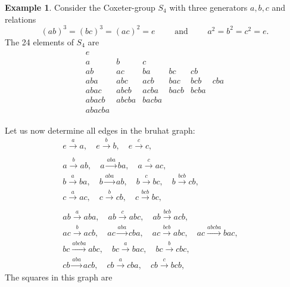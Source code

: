 \documentclass{amsart}
\theoremstyle{definition}
\newtheorem{example}{Example}
\begin{document}
\begin{example}
	Consider the Coxeter-group $S_4$ with three generators $a,b,c$ and relations
	$$
		(ab)^3=(bc)^3=(ac)^2 = e \quad\quad \text{ and } \quad\quad a^2 = b^2 = c^2 = e. 
	$$
	The 24 elements of $S_4$ are
	\begin{gather*}
		\begin{matrix}
			e 		&			&			&			&			& 		\\
			a 		& b 		& c 		&			&			&		\\
			ab 		& ac 		& ba		& bc		& cb 		&		\\
			aba		& abc		& acb		& bac		& bcb		& cba	\\
			abac	& abcb	 	& acba 		& bacb 		& bcba		&		\\
			abacb	& abcba		& bacba		&			&			&		\\
			abacba
		\end{matrix}
	\end{gather*}
	
	Let us now determine all edges in the bruhat graph:
	\begin{gather*}
		e \overset{a}\rightarrow a, \quad
		e \overset{b}\rightarrow b, \quad
		e \overset{c}\rightarrow c, \quad
		\\
		\\
		a \overset{b}\rightarrow ab, \quad
		a \overset{aba}\rightarrow ba, \quad
		a \overset{c}\rightarrow ac, \quad
		\\
		b \overset{a}\rightarrow ba, \quad
		b \overset{aba}\rightarrow ab, \quad
		b \overset{c}\rightarrow bc, \quad
		b \overset{bcb}\rightarrow cb, \quad
		\\
		c \overset{a}\rightarrow ac, \quad
		c \overset{b}\rightarrow cb, \quad
		c \overset{bcb}\rightarrow bc, \quad
		\\
		\\
		ab \overset{a}\rightarrow aba, \quad
		ab \overset{c}\rightarrow abc, \quad
		ab \overset{bcb}\rightarrow acb, \quad
		\\
		ac \overset{b}\rightarrow acb, \quad
		ac \overset{aba}\rightarrow cba, \quad
		ac \overset{bcb}\rightarrow abc, \quad
		ac \overset{abcba}\rightarrow bac, \quad
		\\
		bc \overset{abcba}\rightarrow abc, \quad
		bc \overset{a}\rightarrow bac, \quad
		bc \overset{b}\rightarrow cbc, \quad 
		\\
		cb \overset{aba}\rightarrow acb, \quad
		cb \overset{a}\rightarrow cba, \quad
		cb \overset{c}\rightarrow bcb, \quad 
	\end{gather*}
	The squares in this graph are
	

\end{example}
\end{document}
